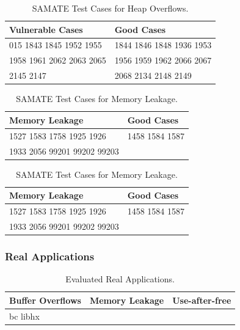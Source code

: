 \begin{table}[!t]
\centering
\begin{tabular}{l|l}
\hline
{\bf \small Vulnerable Cases } & {\bf \small Good Cases} \\
\hline
015 1843 1845 1952 1955 & 1844 1846 1848 1936 1953\\
1958 1961 2062 2063 2065 & 1956 1959 1962 2066 2067 \\
2145 2147 & 2068 2134 2148 2149\\  
\hline
\end{tabular}
\caption{SAMATE Test Cases for Heap Overflows. 
\label{table:SAMATESRDOverflow}}
\end{table}

\begin{table}[!t]
\centering
\begin{tabular}{l|l}
\hline
{\bf \small Memory Leakage } & {\bf \small Good Cases} \\
\hline
1527 1583 1758 1925 1926 & 1458 1584 1587\\
1933 2056 99201 99202 99203 &   \\
\hline
\end{tabular}
\caption{SAMATE Test Cases for Memory Leakage. 
\label{table:SAMATESRDLeak}}
\end{table}

\begin{table}[!t]
\centering
\begin{tabular}{l|l}
\hline
{\bf \small Memory Leakage } & {\bf \small Good Cases} \\
\hline
1527 1583 1758 1925 1926 & 1458 1584 1587\\
1933 2056 99201 99202 99203 &   \\
\hline
\end{tabular}
\caption{SAMATE Test Cases for Memory Leakage. 
\label{table:SAMATESRDLeak}}
\end{table}

\subsubsection{Real Applications}

\begin{table}[!t]
\centering
\begin{tabular}{l|l|l}
\hline
{\bf \small Buffer Overflows} & {\bf \small Memory Leakage} & {\bf \small Use-after-free}\\
\hline
bc libhx & & \\
\hline
\end{tabular}
\caption{Evaluated Real Applications. 
\label{table:realapps}}
\end{table}

